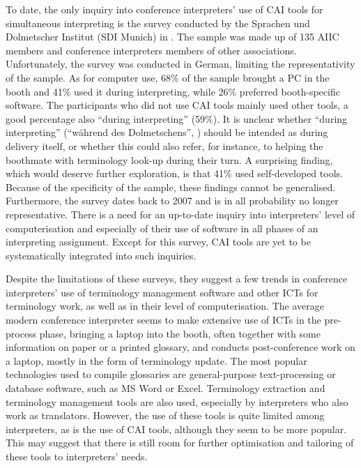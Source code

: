 To date, the only inquiry into conference interpreters' use of CAI tools for simultaneous interpreting is the survey conducted by the Sprachen und Dolmetscher Institut (SDI Munich) in \citeyear{sdi_munchen_detaillierte_2007}. The sample was made up of 135 AIIC members and conference interpreters members of other associations. Unfortunately, the survey was conducted in German, limiting the representativity of the sample. As for computer use, 68\% of the sample brought a PC in the booth and 41\% used it during interpreting, while 26\% preferred booth-specific software. The participants who did not use CAI tools mainly used other tools, a good percentage also ``during interpreting'' (59\%). It is unclear whether ``during interpreting'' (``während des Dolmetschens'', \citealt[28]{sdi_munchen_detaillierte_2007}) should be intended as during delivery itself, or whether this could also refer, for instance, to helping the boothmate with terminology look-up during their turn. A surprising finding, which would deserve further exploration, is that 41\% used self-developed tools. Because of the specificity of the sample, these findings cannot be generalised. Furthermore, the survey dates back to 2007 and is in all probability no longer representative. There is a need for an up-to-date inquiry into interpreters' level of computerisation and especially of their use of software in all phases of an interpreting assignment. Except for this survey, CAI tools are yet to be systematically integrated into such inquiries.

Despite the limitations of these surveys, they suggest a few trends in conference interpreters' use of terminology management software and other ICTs for terminology work, as well as in their level of computerisation. The average modern conference interpreter seems to make extensive use of ICTs in the pre-process phase, bringing a laptop into the booth, often together with some information on paper or a printed glossary, and conducts post-conference work on a laptop, mostly in the form of terminology update.
The most popular technologies used to compile glossaries are general-purpose text-processing or database software, such as MS Word or Excel. Terminology extraction and terminology management tools are also used, especially by interpreters who also work as translators. However, the use of these tools is quite limited among interpreters, as is the use of CAI tools, although they seem to be more popular. This may suggest that there is still room for further optimisation and tailoring of these tools to interpreters' needs.

